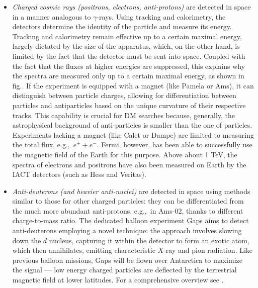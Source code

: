 \begin{itemize}
\item[$\circ$] {\em Charged cosmic rays (positrons, electrons, anti-protons)} are detected in space in a manner analogous to $\gamma$-rays. 
Using tracking and calorimetry, the detectors determine the identity of the particle and measure its energy. 
Tracking and calorimetry remain effective up to a certain maximal energy, largely dictated by the size of the apparatus, which, on the other hand, 
is limited by the fact  that the detector must be sent into space. 
Coupled with the fact that the fluxes at higher energies are suppressed, this explains why the spectra are measured only up to a certain
maximal energy, as shown in fig..
If the experiment is equipped with a magnet (like {\sc Pamela} or {\sc Ams}), it can distinguish between particle charges, allowing for differentiation between particles and antiparticles based on the unique curvature of their respective tracks.
This capability is crucial for DM searches because, generally, the astrophysical background of anti-particles is smaller than the one of particles. 
Experiments lacking a  magnet (like {\sc Calet} or {\sc Dampe}) are limited to measuring the total flux, e.g.,~$e^++e^-$. 
{\sc Fermi}, however, has been able to successfully use the magnetic field of the Earth for this purpose. 
Above about 1 TeV, the spectra of electrons and positrons have also been measured on Earth by the IACT detectors (such as {\sc Hess} and {\sc Veritas}).



\item[$\circ$] {\em Anti-deuterons (and heavier anti-nuclei)} are detected in space using methods similar to those for other charged particles: they can be differentiated from the much more abundant anti-protons, e.g.,~in {\sc Ams-02}, thanks to different charge-to-mass ratio. The dedicated balloon experiment {\sc Gaps} \cite{Gaps} aims to detect anti-deuterons employing a novel technique: the approach involves slowing down the $\bar{d}$ nucleus, capturing it within the detector to form an exotic atom, which then annihilates, emitting characteristic $X$-ray and pion radiation. Like previous balloon missions, {\sc Gaps} will be flown over Antarctica to maximize the signal --- low energy charged particles are deflected by the terrestrial magnetic field at lower latitudes. For a comprehensive overview see \cite{antideuteronssearches}.


\end{itemize}

